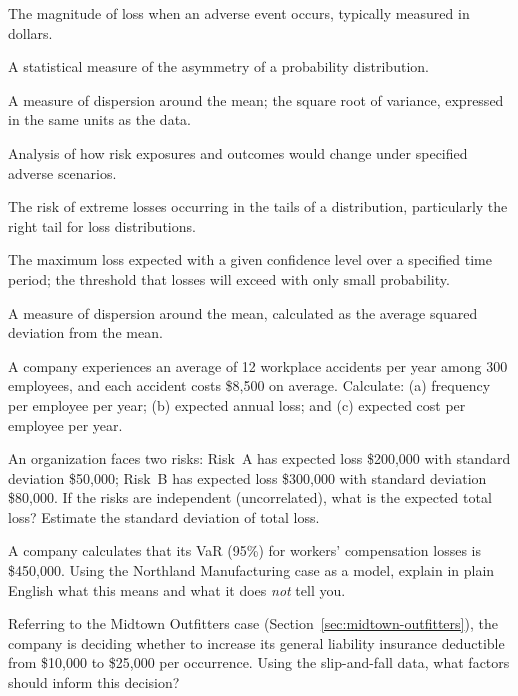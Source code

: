 \documentclass[11pt,openany]{book}
\begin{document}
\begin{keyterms}
  \item[\keyterm{Severity}]
    The magnitude of loss when an adverse event occurs, typically measured in
    dollars.
  \item[\keyterm{Skewness}]
    A statistical measure of the asymmetry of a probability distribution.
  \item[\keyterm{Standard deviation}]
    A measure of dispersion around the mean; the square root of variance,
    expressed in the same units as the data.
  \item[\keyterm{Stress testing}]
    Analysis of how risk exposures and outcomes would change under specified
    adverse scenarios.
  \item[\keyterm{Tail risk}]
    The risk of extreme losses occurring in the tails of a distribution,
    particularly the right tail for loss distributions.
  \item[\keyterm{Value at Risk (VaR)}]
    The maximum loss expected with a given confidence level over a specified
    time period; the threshold that losses will exceed with only small
    probability.
  \item[\keyterm{Variance}]
    A measure of dispersion around the mean, calculated as the average squared
    deviation from the mean.
\end{keyterms}

\begin{shortanswerquestions}
\item A company experiences an average of 12 workplace accidents per year among
  300 employees, and each accident costs \$8,500 on average. Calculate:
  (a) frequency per employee per year; (b) expected annual loss; and
  (c) expected cost per employee per year.

\item An organization faces two risks: Risk~A has expected loss \$200,000 with
  standard deviation \$50,000; Risk~B has expected loss \$300,000 with standard
  deviation \$80,000. If the risks are independent (uncorrelated), what is the
  expected total loss? Estimate the standard deviation of total loss.

\item A company calculates that its VaR (95\%) for workers' compensation losses
  is \$450,000. Using the Northland Manufacturing case as a model, explain in
  plain English what this means and what it does \emph{not} tell you.

\item Referring to the Midtown Outfitters case (Section~\ref{sec:midtown-outfitters}),
  the company is deciding whether to increase its general liability insurance
  deductible from \$10,000 to \$25,000 per occurrence. Using the slip-and-fall
  data, what factors should inform this decision?
\end{shortanswerquestions}
\end{document}
